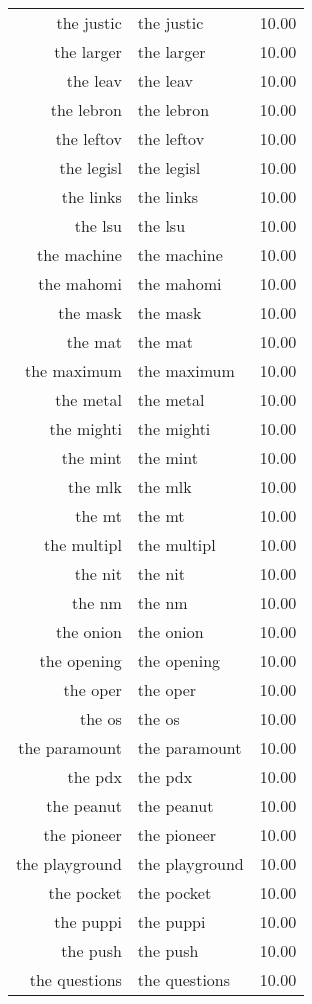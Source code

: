 \begin{table}[ht]
\begin{tabular}{rlr}
  the justic & the justic & 10.00 \\ 
  the larger & the larger & 10.00 \\ 
  the leav & the leav & 10.00 \\ 
  the lebron & the lebron & 10.00 \\ 
  the leftov & the leftov & 10.00 \\ 
  the legisl & the legisl & 10.00 \\ 
  the links & the links & 10.00 \\ 
  the lsu & the lsu & 10.00 \\ 
  the machine & the machine & 10.00 \\ 
  the mahomi & the mahomi & 10.00 \\ 
  the mask & the mask & 10.00 \\ 
  the mat & the mat & 10.00 \\ 
  the maximum & the maximum & 10.00 \\ 
  the metal & the metal & 10.00 \\ 
  the mighti & the mighti & 10.00 \\ 
  the mint & the mint & 10.00 \\ 
  the mlk & the mlk & 10.00 \\ 
  the mt & the mt & 10.00 \\ 
  the multipl & the multipl & 10.00 \\ 
  the nit & the nit & 10.00 \\ 
  the nm & the nm & 10.00 \\ 
  the onion & the onion & 10.00 \\ 
  the opening & the opening & 10.00 \\ 
  the oper & the oper & 10.00 \\ 
  the os & the os & 10.00 \\ 
  the paramount & the paramount & 10.00 \\ 
  the pdx & the pdx & 10.00 \\ 
  the peanut & the peanut & 10.00 \\ 
  the pioneer & the pioneer & 10.00 \\ 
  the playground & the playground & 10.00 \\ 
  the pocket & the pocket & 10.00 \\ 
  the puppi & the puppi & 10.00 \\ 
  the push & the push & 10.00 \\ 
  the questions & the questions & 10.00 \\ 

\end{tabular}
\end{table}
